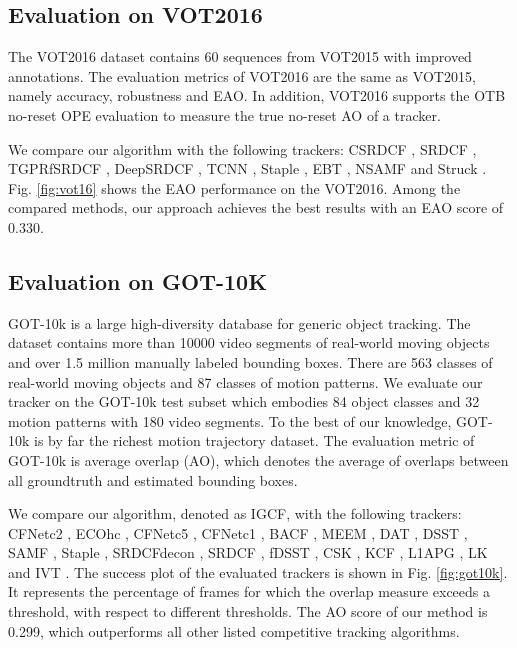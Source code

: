 \documentclass[review]{elsarticle}
\begin{document}
\begin{CJK*}{UTF8}{gbsn}
\subsection{Evaluation on VOT2016}
The VOT2016 \cite{Kristan2016TheVO} dataset contains 60 sequences from VOT2015 with improved annotations. The evaluation metrics of VOT2016 are the same as VOT2015, namely accuracy, robustness and EAO. In addition, VOT2016 supports the OTB no-reset OPE evaluation to measure the true no-reset AO of a tracker.

We compare our algorithm with the following trackers:
CSRDCF \cite{Lukezic2017DiscriminativeCF}, SRDCF \cite{Danelljan2015LearningSR}, TGPRfSRDCF \cite{gao2018tracking}, DeepSRDCF \cite{Danelljan2015ConvolutionalFF}, TCNN \cite{nam2016modeling}, Staple \cite{Bertinetto2016StapleC}, EBT \cite{Zhu2016BeyondLS}, NSAMF \cite{Hua2015OnlineOT} and Struck \cite{Hare2011StruckSO}. Fig. \ref{fig:vot16} shows the EAO performance on the VOT2016. Among the compared methods, our approach achieves the best results with an EAO score of 0.330.

\subsection{Evaluation on GOT-10K}
GOT-10k \cite{Huang2018GOT10kAL} is a large high-diversity database for generic object tracking. The dataset contains more than 10000 video segments of real-world moving objects and over 1.5 million manually labeled bounding boxes. There are 563 classes of real-world moving objects and 87 classes of motion patterns. We evaluate our tracker on the GOT-10k test subset which embodies 84 object classes and 32 motion patterns with 180 video segments. To the best of our knowledge, GOT-10k is by far the richest motion trajectory dataset.
The evaluation metric of GOT-10k is average overlap (AO), which denotes the average of overlaps between all groundtruth and estimated bounding boxes. 

We compare our algorithm, denoted as IGCF, with the following trackers: CFNetc2 \cite{Valmadre2017EndtoEndRL}, ECOhc \cite{Danelljan2017ECOEC}, CFNetc5 \cite{Valmadre2017EndtoEndRL}, CFNetc1 \cite{Valmadre2017EndtoEndRL}, BACF \cite{Galoogahi2017LearningBC}, MEEM \cite{Zhang2014MEEMRT}, DAT \cite{Possegger2015InDO}, DSST \cite{Danelljan2014AccurateSE}, SAMF \cite{Li2014ASA}, Staple \cite{Bertinetto2016StapleC}, SRDCFdecon \cite{Danelljan2016AdaptiveDO}, SRDCF \cite{Danelljan2015LearningSR}, fDSST \cite{Danelljan2017DiscriminativeSS}, CSK \cite{Henriques2012ExploitingTC}, KCF \cite{Henriques2015HighSpeedTW}, L1APG \cite{Bao2012RealTR}, LK \cite{Shi1994GoodFT} and IVT \cite{Ross2007IncrementalLF}. The success plot of the evaluated trackers is shown in Fig. \ref{fig:got10k}. It represents the percentage of frames for which the overlap measure exceeds a threshold, with respect to different thresholds. The AO score of our method is 0.299, which outperforms all other listed competitive tracking algorithms.


\end{CJK*}
\end{document}
